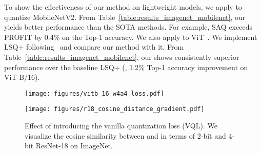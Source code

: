To show the effectiveness of our method on lightweight models, we apply \methodshortname to quantize MobileNetV2. From Table~\ref{table:results_imagenet_mobilenet}, our \methodshortname yields better performance than the SOTA  methods. For example, SAQ exceeds PROFIT by 0.4\% on the Top-1 accuracy. We also apply \methodshortname to ViT~\cite{dosovitskiy2020image}. We implement LSQ+ following~\cite{li2022q} and compare our method with it. From Table~\ref{table:results_imagenet_mobilenet}, our \methodshortname shows consistently superior performance over the baseline LSQ+ (\eg, 1.2\% Top-1 accuracy improvement on ViT-B/16). 


\begin{figure}[!t]

        \begin{minipage}[t]{0.22\textwidth}
        \centering
        \texttt{[image: figures/vitb\_16\_w4a4\_loss.pdf]}
        \vspace{-0.1in}
        \caption{}
        \label{fig:curve_comparisons}
        \end{minipage}
        \hspace{0.05in}
        \begin{minipage}[t]{0.23\textwidth}
        \centering
        \texttt{[image: figures/r18\_cosine\_distance\_gradient.pdf]}
        \vspace{-0.1in}
        \caption{Effect of introducing the vanilla quantization loss (VQL). We visualize the cosine similarity between  and  in terms of 2-bit and 4-bit ResNet-18 on ImageNet.}
        \label{fig:cosine_distance_two_loss}
        \end{minipage}
    \vspace{-0.3in}
\end{figure}

